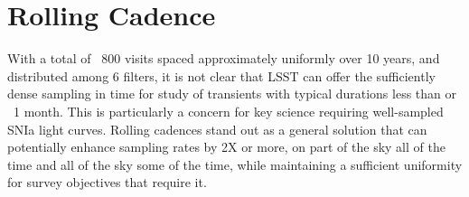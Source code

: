 

%

%
%
%
%
%
%

\section{ Rolling Cadence }
\label{sec:keyword} %



With a total of ~800 visits spaced approximately uniformly over 10 years, and distributed among 6 filters, 
it is not clear that LSST can offer the sufficiently dense sampling in time for study of transients with typical durations less than or ~1 month.
This is particularly a concern for key science requiring well-sampled SNIa light curves.  Rolling cadences stand out as a
general solution that can potentially enhance sampling rates by 2X or more, on part of the sky all of the time and all of the sky some of the time,
while maintaining a sufficient uniformity for survey objectives that require it.

